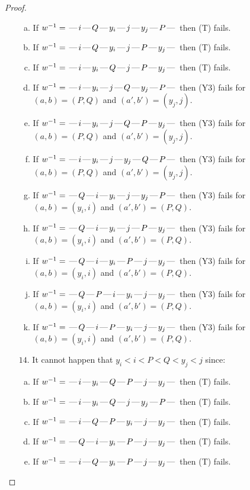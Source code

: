 \documentclass[10pt]{article}
\theoremstyle{definition}
\theoremstyle{definition}
\def\dash{\text{\hspace{0.5mm}---\hspace{0.5mm}}}
\begin{document}
\begin{proof}
\begin{enumerate}
\begin{enumerate}[(a)]
\item If $w^{-1} = \dash i\dash Q\dash y_i\dash j\dash y_j\dash P\dash $ then (T) fails.
\item If $w^{-1} = \dash i\dash Q\dash y_i\dash j\dash P\dash y_j\dash $ then (T) fails.
\item If $w^{-1} = \dash i\dash y_i\dash Q\dash j\dash P\dash y_j\dash $ then (T) fails.
\item If $w^{-1} = \dash i\dash y_i\dash j\dash Q\dash y_j\dash P\dash $ then (Y3) fails for $(a,b)=(P,Q)$ and $(a',b')=(y_j,j)$.
\item If $w^{-1} = \dash i\dash y_i\dash j\dash Q\dash P\dash y_j\dash $ then (Y3) fails for $(a,b)=(P,Q)$ and $(a',b')=(y_j,j)$.
\item If $w^{-1} = \dash i\dash y_i\dash j\dash y_j\dash Q\dash P\dash $ then (Y3) fails for $(a,b)=(P,Q)$ and $(a',b')=(y_j,j)$.
\item If $w^{-1} = \dash Q\dash i\dash y_i\dash j\dash y_j\dash P\dash $ then (Y3) fails for $(a,b)=(y_i,i)$ and $(a',b')=(P,Q)$.
\item If $w^{-1} = \dash Q\dash i\dash y_i\dash j\dash P\dash y_j\dash $ then (Y3) fails for $(a,b)=(y_i,i)$ and $(a',b')=(P,Q)$.
\item If $w^{-1} = \dash Q\dash i\dash y_i\dash P\dash j\dash y_j\dash $ then (Y3) fails for $(a,b)=(y_i,i)$ and $(a',b')=(P,Q)$.
\item If $w^{-1} = \dash Q\dash P\dash i\dash y_i\dash j\dash y_j\dash $ then (Y3) fails for $(a,b)=(y_i,i)$ and $(a',b')=(P,Q)$.
\item If $w^{-1} = \dash Q\dash i\dash P\dash y_i\dash j\dash y_j\dash $ then (Y3) fails for $(a,b)=(y_i,i)$ and $(a',b')=(P,Q)$.
\end{enumerate}
\item[$14$.] It cannot happen that $y_i < i < P < Q < y_j < j$ since:
\begin{enumerate}[(a)]
\item If $w^{-1} = \dash i\dash y_i\dash Q\dash P\dash j\dash y_j\dash $ then (T) fails.
\item If $w^{-1} = \dash i\dash y_i\dash Q\dash j\dash y_j\dash P\dash $ then (T) fails.
\item If $w^{-1} = \dash i\dash Q\dash P\dash y_i\dash j\dash y_j\dash $ then (T) fails.
\item If $w^{-1} = \dash Q\dash i\dash y_i\dash P\dash j\dash y_j\dash $ then (T) fails.
\item If $w^{-1} = \dash i\dash Q\dash y_i\dash P\dash j\dash y_j\dash $ then (T) fails.

\end{enumerate}
\end{enumerate}
\end{proof}
\end{document}
